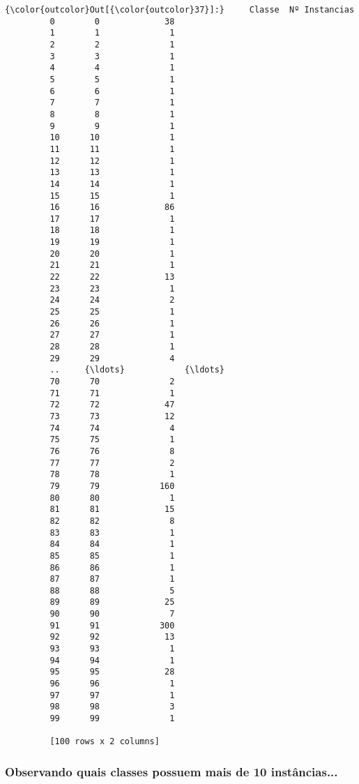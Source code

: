 \documentclass[11pt]{article}
\begin{document}
\begin{Verbatim}[commandchars=\\\{\}]
{\color{outcolor}Out[{\color{outcolor}37}]:}     Classe  Nº Instancias
         0        0             38
         1        1              1
         2        2              1
         3        3              1
         4        4              1
         5        5              1
         6        6              1
         7        7              1
         8        8              1
         9        9              1
         10      10              1
         11      11              1
         12      12              1
         13      13              1
         14      14              1
         15      15              1
         16      16             86
         17      17              1
         18      18              1
         19      19              1
         20      20              1
         21      21              1
         22      22             13
         23      23              1
         24      24              2
         25      25              1
         26      26              1
         27      27              1
         28      28              1
         29      29              4
         ..     {\ldots}            {\ldots}
         70      70              2
         71      71              1
         72      72             47
         73      73             12
         74      74              4
         75      75              1
         76      76              8
         77      77              2
         78      78              1
         79      79            160
         80      80              1
         81      81             15
         82      82              8
         83      83              1
         84      84              1
         85      85              1
         86      86              1
         87      87              1
         88      88              5
         89      89             25
         90      90              7
         91      91            300
         92      92             13
         93      93              1
         94      94              1
         95      95             28
         96      96              1
         97      97              1
         98      98              3
         99      99              1
         
         [100 rows x 2 columns]
\end{Verbatim}
            
    \subsubsection{Observando quais classes possuem mais de 10
instâncias...}\label{observando-quais-classes-possuem-mais-de-10-instuxe2ncias...}
\end{document}
